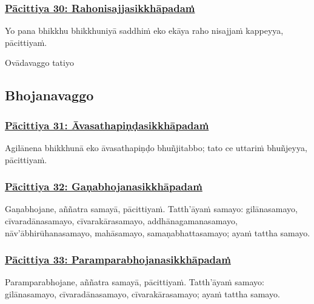 \subsubsection*{\hyperref[exp30]{Pācittiya 30: Rahonisajjasikkhāpadaṁ}}
\label{pac30}

Yo pana bhikkhu bhikkhuniyā saddhiṁ eko ekāya raho nisajjaṁ kappeyya, pācittiyaṁ.

\begin{center}
	Ovādavaggo tatiyo
\end{center}



\subsection{Bhojanavaggo}

\subsubsection*{\hyperref[exp31]{Pācittiya 31: Āvasathapiṇḍasikkhāpadaṁ}}
\label{pac31}

Agilānena bhikkhunā eko āvasathapiṇḍo bhuñjitabbo; tato ce uttariṁ bhuñjeyya, pācittiyaṁ.



\subsubsection*{\hyperref[exp32]{Pācittiya 32: Gaṇabhojanasikkhāpadaṁ}}
\label{pac32}

Gaṇabhojane, aññatra samayā, pācittiyaṁ. Tatth'āyaṁ samayo: gilānasamayo, cīvaradānasamayo, cīvarakārasamayo, addhānagamanasamayo, nāv'ābhirūhanasamayo, mahāsamayo, samaṇabhattasamayo; ayaṁ tattha samayo.



\subsubsection*{\hyperref[exp33]{Pācittiya 33: Paramparabhojanasikkhāpadaṁ}}
\label{pac33}

Paramparabhojane, aññatra samayā, pācittiyaṁ. Tatth'āyaṁ samayo: gilānasamayo, cīvaradānasamayo, cīvarakārasamayo; ayaṁ tattha samayo.



